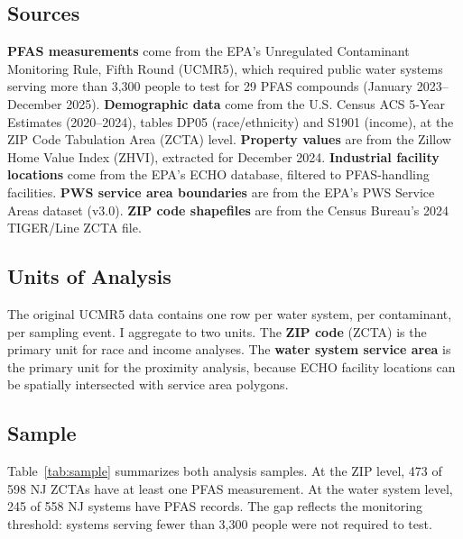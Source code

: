 \documentclass[9pt,twocolumn]{extarticle}
\begin{document}
\subsection{Sources}
\textbf{PFAS measurements} come from the EPA's Unregulated Contaminant Monitoring Rule, Fifth Round (UCMR5), which required public water systems serving more than 3,300 people to test for 29 PFAS compounds (January 2023--December 2025). \textbf{Demographic data} come from the U.S. Census ACS 5-Year Estimates (2020--2024), tables DP05 (race/ethnicity) and S1901 (income), at the ZIP Code Tabulation Area (ZCTA) level. \textbf{Property values} are from the Zillow Home Value Index (ZHVI), extracted for December 2024. \textbf{Industrial facility locations} come from the EPA's ECHO database, filtered to PFAS-handling facilities. \textbf{PWS service area boundaries} are from the EPA's PWS Service Areas dataset (v3.0). \textbf{ZIP code shapefiles} are from the Census Bureau's 2024 TIGER/Line ZCTA file.

\subsection{Units of Analysis}
The original UCMR5 data contains one row per water system, per contaminant, per sampling event. I aggregate to two units. The \textbf{ZIP code} (ZCTA) is the primary unit for race and income analyses. The \textbf{water system service area} is the primary unit for the proximity analysis, because ECHO facility locations can be spatially intersected with service area polygons.

\subsection{Sample}
Table~\ref{tab:sample} summarizes both analysis samples. At the ZIP level, 473 of 598 NJ ZCTAs have at least one PFAS measurement. At the water system level, 245 of 558 NJ systems have PFAS records. The gap reflects the monitoring threshold: systems serving fewer than 3,300 people were not required to test.
\end{document}
